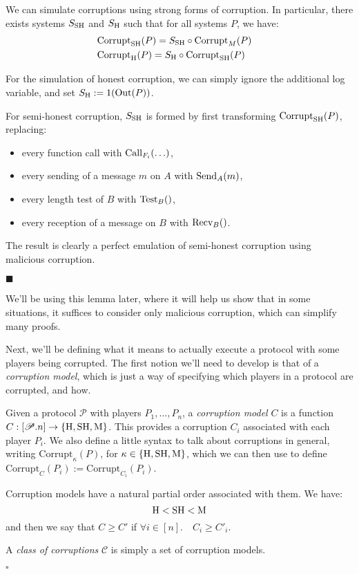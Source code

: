 \begin{lemma}
  \label{thm:simulatingcorruption}
  We can simulate corruptions using strong forms of corruption.
  In particular, there exists systems $S_{\text{SH}}$ and $S_{\text{H}}$ such that
  for all systems $P$, we have:
  \[
    \begin{aligned}
      &\text{Corrupt}_{\text{SH}}(P) = S_{\text{SH}} \circ \text{Corrupt}_M(P)\cr
      &\text{Corrupt}_{\text{H}}(P) = S_{\text{H}} \circ \text{Corrupt}_{\text{SH}}(P)
    \end{aligned}
  \]

For the simulation of honest corruption, we can simply ignore
  the additional log variable, and set $S_{\text{H}} := 1(\text{Out}(P))$.

For semi-honest corruption, $S_{\text{SH}}$ is formed by first transforming
$\text{Corrupt}_{\text{SH}}(P)$, replacing:
\begin{itemize}
  \item every function call with $\text{Call}_{F_i}(\ldots)$,
  \item every sending of a message $m$ on $A$ with $\text{Send}_A(m)$,
  \item every length test of $B$ with $\text{Test}_B()$,
  \item every reception of a message on $B$ with $\text{Recv}_B()$.
\end{itemize}

The result is clearly a perfect emulation of semi-honest corruption
using malicious corruption.

$\blacksquare$
\end{lemma}

We'll be using this lemma later, where it will help us show
that in some situations, it suffices to consider only malicious
corruption, which can simplify many proofs.

Next, we'll be defining what it means to actually execute
a protocol with some players being corrupted.
The first notion we'll need to develop is that of a \emph{corruption model},
which is just a way of specifying which players in a protocol are corrupted,
and how.



\begin{definition}
Given a protocol $\mathscr{P}$ with players $P_1, \ldots, P_n$, a \emph{corruption model} $C$
is a function $C : [\mathscr{P}.n] \to \{\text{H}, \text{SH}, \text{M}\}$.
This provides a corruption $C_i$ associated with each player $P_i$.
We also define a little syntax to talk about corruptions in general,
writing $\text{Corrupt}_\kappa(P)$,
for $\kappa \in \{\text{H}, \text{SH}, \text{M}\}$, which we can then use
to define $\text{Corrupt}_C(P_i) := \text{Corrupt}_{C_i}(P_i)$.

Corruption models have a natural partial order associated with them. 
We have:
$$
\text{H} < \text{SH} < \text{M}
$$
  and then we say that $C \geq C'$ if $\forall i \in [n]. \quad C_i \geq C'_i$.

A \emph{class of corruptions} $\mathscr{C}$ is simply a set of corruption models.

$\square$
\end{definition}

